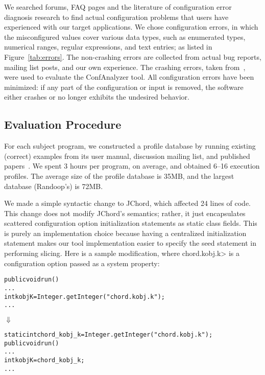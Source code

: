 We searched forums, FAQ pages and the literature of
configuration error diagnosis research to find actual
configuration problems that users have experienced with our
target applications. 
We chose \errors configuration errors, in which
the misconfigured values cover various data types, such as enumerated types,
numerical ranges, regular expressions, and text entries;
as listed in Figure~\ref{tab:errors}. The \noncrash non-crashing errors
are collected from actual bug reports, mailing list posts, and our own experience.
The \crash crashing errors, taken from~\cite{Rabkin:2011:PPC},
were used to evaluate the ConfAnalyzer tool.
All \errors configuration errors have been minimized: if
any part of the configuration or input is removed, the software
either crashes or no longer exhibits the undesired behavior.



\subsection{Evaluation Procedure}

For each subject program, we constructed a profile database
by running existing (correct) examples from its user manual, discussion
mailing list, and published papers~\cite{PachecoLET2007, Beschastnikh:2011, Rabkin:2011:PPC}.
We spent 3 hours per program, on average, and obtained 6--16 execution profiles.
The average size of the profile database is 35MB, and the largest database (Randoop's)
is 72MB.

We made a simple syntactic change to JChord, which affected 24 
lines of code. This change
does not modify JChord's semantics; rather, it just encapsulates
scattered configuration option initialization statements 
as static class fields. This is purely an implementation
choice because having a centralized initialization statement
makes our tool implementation easier to specify the seed statement
in performing slicing. Here is a sample modification, where 
\<chord.kobj.k> 
is a configuration option
passed as a system property:


\begin{CodeOut}
\begin{alltt}
public void run() \ttlcb
  ...
  int kobjK = Integer.getInteger("chord.kobj.k");
  ...
\ttrcb
\end{alltt}
\end{CodeOut}
\vspace{-4mm}
\hspace{20mm}$\Downarrow$ 
\begin{CodeOut}
\begin{alltt}
static int chord\_kobj\_k = Integer.getInteger("chord.kobj.k");
public void run() \ttlcb
  ...
  int kobjK = chord\_kobj\_k; 
  ...
\ttrcb
\end{alltt}
\end{CodeOut}


